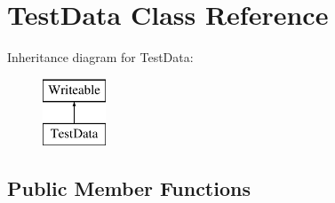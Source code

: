 \hypertarget{classTestData}{\section{Test\-Data Class Reference}
\label{classTestData}
}
Inheritance diagram for Test\-Data\-:\begin{figure}[H]
\begin{center}
\leavevmode
\includegraphics[height=2.000000cm]{classTestData}
\end{center}
\end{figure}
\subsection*{Public Member Functions}
